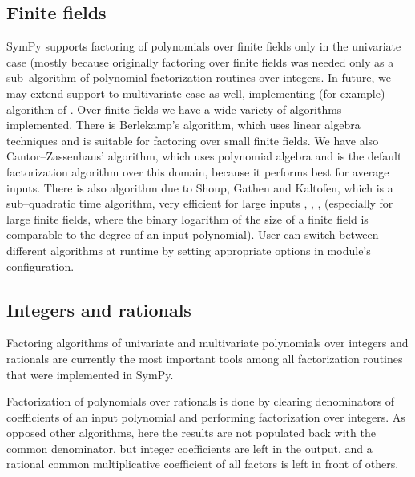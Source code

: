 \subsection{Finite fields}

SymPy supports factoring of polynomials over finite fields only in the univariate case (mostly because
originally factoring over finite fields was needed only as a sub--algorithm of polynomial factorization
routines over integers. In future, we may extend support to multivariate case as well, implementing (for
example) algorithm of \cite{Gathen1983polytime}. Over finite fields we have a wide variety of algorithms
implemented. There is Berlekamp's algorithm, which uses linear algebra techniques and is suitable for
factoring over small finite fields. We have also Cantor--Zassenhaus' algorithm, which uses polynomial
algebra and is the default factorization algorithm over this domain, because it performs best for average
inputs. There is also algorithm due to Shoup, Gathen and Kaltofen, which is a sub--quadratic time algorithm,
very efficient for large inputs \cite{Gathen1992frobenious}, \cite{Shoup1993reality}, \cite{Kaltofen1995subquadratic},
\cite{Shoup1995factor} (especially for large finite fields, where the binary logarithm of the size of a
finite field is comparable to the degree of an input polynomial). User can switch between different
algorithms at runtime by setting appropriate options in module's configuration.


\subsection{Integers and rationals}

Factoring algorithms of univariate and multivariate polynomials over integers and rationals are
currently the most important tools among all factorization routines that were implemented in SymPy.

Factorization of polynomials over rationals is done by clearing denominators of coefficients of an input
polynomial and performing factorization over integers. As opposed other algorithms, here the results are
not populated back with the common denominator, but integer coefficients are left in the output, and a
rational common multiplicative coefficient of all factors is left in front of others.

